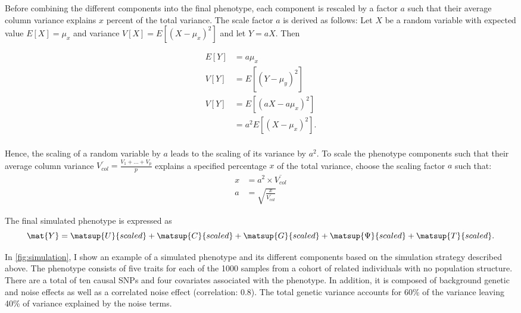 Before combining the different components into the final phenotype, each component is rescaled by a factor \(a\) such that their average column variance explains \(x\) percent of the total variance. The scale factor \(a\) is derived as follows: 
Let \(X\) be a random variable with expected value \(E[X] = \mu_{x}\) and variance \(V[X] = E[(X - \mu_{x})^2]\) and let  \(Y = aX\). Then
  
\begin{equation}
\begin{aligned}
E[Y] &= a\mu_{x} \\
V[Y] &= E[(Y - \mu_{y})^2] \\
V[Y] &= E[(aX - a\mu_{x})^2] \\
		&= a^2 E[(X - \mu_{x})^2]. \\
\end{aligned}
\end{equation}

Hence, the scaling of a random variable by \(a\) leads to the scaling of its variance by \(a^2\). To scale the phenotype components such that their average column variance \(\overline{V_{col}} = \frac{V_1 + ... + V_p}{p} \) explains a specified  percentage \(x\) of the total variance, choose the scaling factor \(a\) such that: 
\begin{equation}
\begin{aligned}
x  &= a^2 \times \overline{V_{col}} \\
a  &= \sqrt{\frac{x}{\overline{V_{col}}}}
\end{aligned}
\end{equation}

The final simulated phenotype is expressed as
\begin{equation}
\mat{Y} = \matsup{U}{scaled}   + \matsup{C}{scaled} +  \matsup{G}{scaled} +  \matsup{\Psi}{scaled} + \matsup{T}{scaled}. 
\end{equation}

In \cref{fig:simulation}, I show an example of a simulated phenotype and its different components based on the simulation strategy described above. The phenotype consists of five traits for each of the \num{1000} samples from a cohort of related individuals with no population structure. There are a total of ten causal SNPs and four covariates associated with the phenotype. In addition, it is composed of background genetic and noise effects as well as a correlated noise effect (correlation: \num{0.8}). The total genetic variance accounts for \num{60}\% of the variance leaving \num{40}\% of variance explained by the noise terms.

